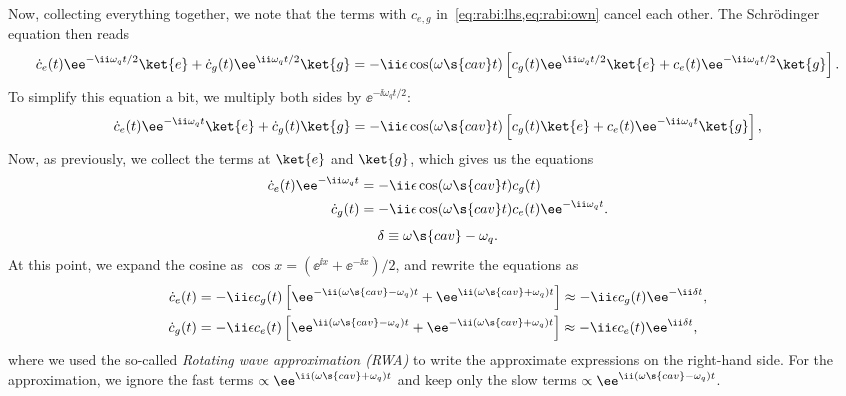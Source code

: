 \documentclass[fontsize=9pt,bookmarkpackage=false]{scrartcl}
\begin{document}
Now, collecting everything together, we note that the terms with $c_{e,g}$ in~\cref{eq:rabi:lhs,eq:rabi:own} cancel each other.
The Schrödinger equation then reads
\begin{equation}
  \dot c_e (t) \ee^{ - \ii \omega_q t / 2 } \ket{ e }
  +
  \dot c_g (t) \ee^{ \ii \omega_q t / 2 } \ket{ g } =
  - \ii \epsilon \cos ( \omega\s{cav} t )
  \left[
  c_g (t) \ee^{ \ii \omega_q t / 2 } \ket{ e }
  +
  c_e (t) \ee^{ - \ii \omega_q t / 2 } \ket{ g }
  \right].
\end{equation}
To simplify this equation a bit, we multiply both sides by $\ee^{ - \ii \omega_ q t / 2 }$:
\begin{equation}
  \dot c_e (t) \ee^{ - \ii \omega_q t} \ket{ e }
  +
  \dot c_g (t) \ket{ g } =
  - \ii \epsilon
  \cos( \omega\s{cav} t )
  \left[
  c_g (t) \ket{ e }
  +
  c_e (t) \ee^{ - \ii \omega_q t } \ket{ g }
  \right],
\end{equation}
Now, as previously, we collect the terms at $\ket{ e}$ and $\ket{ g }$, which gives us the equations
\begin{align}
  \dot c_e (t) \ee^{ - \ii \omega_q  t }
  & =
  - \ii \epsilon \cos ( \omega\s{cav} t ) c_g (t)
  \\
  \dot c_g (t)
  & =
  - \ii \epsilon \cos ( \omega\s{cav} t ) c_e (t) \ee^{ - \ii\omega_q t }.
\end{align}
\begin{equation}
  \delta \equiv \omega\s{cav} - \omega_q .
\end{equation}
At this point, we expand the cosine as $\cos x = ( \ee^{ \ii x } + \ee^{ - \ii x } ) / 2 $, and rewrite the equations as
\begin{align}
  \label{eq:rabi:cedot}
  \dot c_e (t) & =
  - \ii \epsilon c_g (t)
  \left[
    \ee^{ - \ii ( \omega\s{cav} - \omega_q ) t }
    +
    \ee^{ \ii ( \omega\s{cav} + \omega_q ) t }
  \right]
  \approx
  - \ii \epsilon c_g (t) \ee^{ - \ii \delta t }
  ,
  \\
  \dot c_g (t) & =
  - \ii \epsilon c_e (t)
  \left[
    \ee^{ \ii ( \omega\s{cav} - \omega_q ) t }
    +
    \ee^{ - \ii ( \omega\s{cav} + \omega_q ) t }
  \right]
  \approx
  - \ii \epsilon c_e (t) \ee^{ \ii \delta t }
  ,
\end{align}
where we used the so-called \emph{Rotating wave approximation (RWA)} to write the approximate expressions on the right-hand side.
For the approximation, we ignore the fast terms $\propto \ee^{ \ii ( \omega\s{cav} + \omega_q ) t }$  and keep only the slow terms $\propto \ee^{ \ii ( \omega\s{cav} - \omega_q ) t }$.
\end{document}
